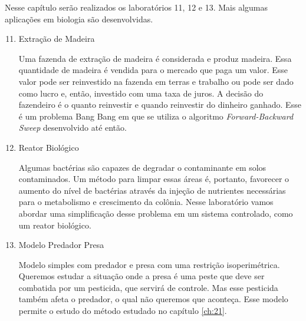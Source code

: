 Nesse capítulo serão realizados os laboratórios 11, 12 e 13. Mais algumas
aplicações em biologia são desenvolvidas.

\begin{enumerate}[label=\textbf{Lab \arabic*:}]
    \setcounter{enumi}{10}

    \item Extração de Madeira
    
    Uma fazenda de extração de madeira é considerada e produz madeira. Essa
    quantidade de madeira é vendida para o mercado que paga um valor. Esse
    valor pode ser reinvestido na fazenda em terras e trabalho ou pode ser
    dado como lucro e, então, investido com uma taxa de juros. A decisão do
    fazendeiro é o quanto reinvestir e quando reinvestir do dinheiro ganhado.
    Esse é um problema Bang Bang em que se utiliza o algoritmo
    \textit{Forward-Backward Sweep} desenvolvido até então. 

    \item Reator Biológico 
    
    Algumas bactérias são capazes de degradar o contaminante em solos
    contaminados. Um método para limpar essas áreas é, portanto, favorecer o
    aumento do nível de bactérias através da injeção de nutrientes
    necessárias para o metabolismo e crescimento da colônia. Nesse laboratório
    vamos abordar uma simplificação desse problema em um sistema controlado,
    como um reator biológico. 

    \item Modelo Predador Presa 
    
    Modelo simples com predador e presa com uma restrição isoperimétrica.
    Queremos estudar a situação onde a presa é uma peste que deve ser
    combatida por um pesticida, que servirá de controle. Mas esse pesticida
    também afeta o predador, o qual não queremos que aconteça. Esse modelo
    permite o estudo do método estudado no capítulo \ref{ch:21}. 
    

\end{enumerate}